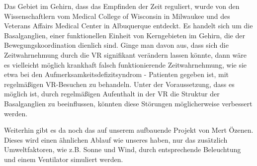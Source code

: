 \documentclass{Bericht}
\begin{document}
Das Gebiet im Gehirn, dass das Empfinden der Zeit reguliert, wurde von den Wissenschaftlern vom Medical College of Wisconsin in Milwaukee und des Veterans Affairs Medical Center in Albuquerque entdeckt. Es handelt sich um die Basalganglien, einer funktionellen Einheit von Kerngebieten im Gehirn, die der Bewegungskoordination dienlich sind. Ginge man davon aus, dass sich die Zeitwahrnehmung durch die VR signifikant verändern lassen könnte, dann wäre es vielleicht möglich krankhaft falsch funktionierende Zeitwahrnehmung, wie sie etwa bei den Aufmerksamkeitsdefizitsyndrom - Patienten gegeben ist, mit regelmäßigen VR-Besuchen zu behandeln. Unter der Voraussetzung, dass es  möglich ist, durch regelmäßigen Aufenthalt in der VR die Struktur der Basalganglien zu beeinflussen, könnten diese Störungen möglicherweise verbessert werden.
 
Weiterhin gibt es da noch das auf unserem aufbauende Projekt von Mert Özenen. Dieses wird einen ähnlichen Ablauf wie unseres haben, nur das zusätzlich Umweltfaktoren, wie z.B. Sonne und Wind, durch entsprechende Beleuchtung und einem Ventilator simuliert werden.
\end{document}
